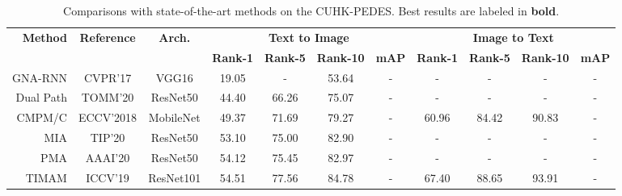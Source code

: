 \begin{table*}[t]
\begin{center}
\renewcommand\arraystretch{1.06}
\footnotesize
\caption{Comparisons with state-of-the-art methods on the CUHK-PEDES. Best results are labeled in \textbf{bold}.}
\setlength{\tabcolsep}{2.9mm}
\begin{tabular}{r|c|c|c|c|c|c|c|c|c|c}
\hline
\multirow{2}{*}{\textbf{Method}} & \multirow{2}{*}{\textbf{Reference}} & \multirow{2}{*}{\textbf{Arch.}} & \multicolumn{4}{c|}{\textbf{Text to Image}}             & \multicolumn{4}{c}{\textbf{Image to Text}}             \\ \cline{4-11} 
                                 &        &                          & \textbf{Rank-1} & \textbf{Rank-5} & \textbf{Rank-10} & \textbf{mAP} & \textbf{Rank-1} & \textbf{Rank-5} & \textbf{Rank-10} & \textbf{mAP} \\ \hline \hline

GNA-RNN \cite{li2017person}     &CVPR’17                     & VGG16                          & 19.05           & -               & 53.64            & -            & -               & -               & -                & -            \\ 


Dual Path \cite{zheng2020dual}    &TOMM’20                     & ResNet50                           & 44.40           & 66.26           & 75.07            & -            & -               & -               & -                & -            \\ 


CMPM/C \cite{zhang2018cmpc} &ECCV’2018             & MobileNet                              & 49.37           & 71.69           & 79.27            & -        & 60.96           & 84.42           & 90.83            & -        \\ 
MIA \cite{niu2020mia}       &TIP’20                       & ResNet50                                & 53.10           & 75.00           & 82.90            & -            & -               & -               & -                & -            \\ 
PMA \cite{jing2020pose}    &AAAI’20                            & ResNet50                              & 54.12           & 75.45           & 82.97            & -            & -               & -               & -                & -            \\ 


TIMAM \cite{sarafianos2019adversarial}   &ICCV’19                         & ResNet101                               & 54.51           & 77.56           & 84.78            & -        & 67.40           & 88.65           & 93.91            & -        \\ 



\end{tabular}
\end{center}
\end{table*}
